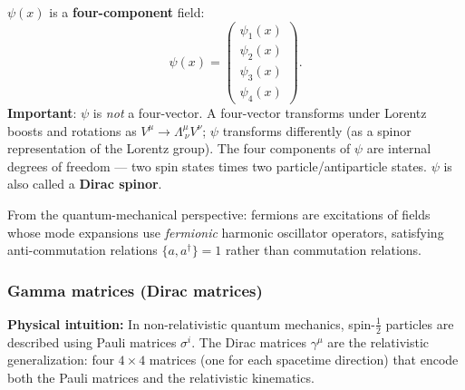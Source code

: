 \documentclass[../main.tex]{subfiles}
\begin{document}
$\psi(x)$ is a \textbf{four-component} field:
\begin{equation}
  \psi(x) = \begin{pmatrix}\psi_1(x)\\\psi_2(x)\\\psi_3(x)\\\psi_4(x)\end{pmatrix}.
  \label{eq:lec07:spinor-components}
\end{equation}
\textbf{Important}: $\psi$ is \emph{not} a four-vector.  A four-vector transforms under Lorentz boosts and rotations as $V^\mu \to \Lambda^\mu_{\ \nu}V^\nu$; $\psi$ transforms differently (as a spinor representation of the Lorentz group).  The four components of $\psi$ are internal degrees of freedom — two spin states times two particle/antiparticle states.  $\psi$ is also called a \textbf{Dirac spinor}.

From the quantum-mechanical perspective: fermions are excitations of fields whose mode expansions use \emph{fermionic} harmonic oscillator operators, satisfying anti-commutation relations $\{a, a^\dagger\} = 1$ rather than commutation relations.

\subsubsection*{Gamma matrices (Dirac matrices)}

\noindent\textbf{Physical intuition:} In non-relativistic quantum mechanics, spin-$\frac{1}{2}$ particles are described using Pauli matrices $\sigma^i$.  The Dirac matrices $\gamma^\mu$ are the relativistic generalization: four $4\times4$ matrices (one for each spacetime direction) that encode both the Pauli matrices and the relativistic kinematics.
\end{document}
